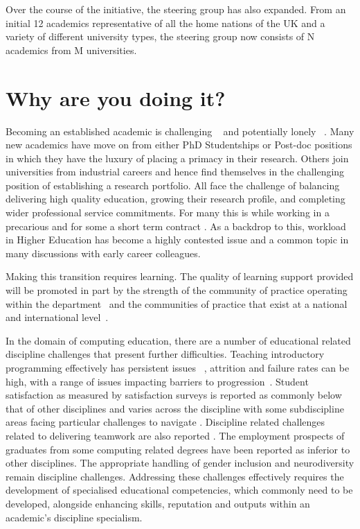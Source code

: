 \documentclass[sigconf]{acmart}
\begin{document}
Over the course of the initiative, the steering group has also expanded. From an initial 12 academics representative of all the home nations of the UK and a variety of different university types, the steering group now consists of N academics from M universities. 

\section{Why are you doing it?}
\label{sec:Why}
Becoming an established academic is challenging ~\cite{Thomas2015} and potentially lonely ~\cite{Foote2009}. Many new academics have move on from either PhD Studentships or Post-doc positions in which they have the luxury of placing a primacy in their research. Others join universities from industrial careers and hence find themselves in the challenging position of establishing a research portfolio. All face the challenge of balancing delivering high quality education, growing their research profile, and completing wider professional service commitments. For many this is while working in a precarious and for some a short term contract \cite{UCU,JaffeS}. As a backdrop to this, workload in Higher Education has become a highly contested issue \cite{UCU2016}and a common topic in many discussions with early career colleagues.

Making this transition requires learning. The quality of learning support provided will be promoted in part by the strength of the community of practice operating within the department~\cite{Bolander2008} and the communities of practice that exist at a national and international level~\cite{Thomas2015}.

In the domain of computing education, there are a number of educational related discipline challenges that present further difficulties. Teaching introductory programming effectively has persistent issues ~\cite{davenport-et-al:latice2016,murphy-et-al:programming2017,simon-et-al:sigcse2018}, attrition and failure rates can be high, with a range of issues impacting barriers to progression~\cite{Watson:2014:FRI:2591708.2591749}. Student satisfaction as measured by satisfaction surveys is reported as commonly below that of other disciplines \cite{Sinclair2015} and varies across the discipline with some subdiscipline areas facing particular challenges to navigate \cite{Knutas2021}. Discipline related challenges related to delivering teamwork are also reported \cite{Gordon2010,Phillips2021}. The employment prospects of graduates from some computing related degrees have been reported as inferior to other disciplines\cite{shadbolt2016shadbolt}. The appropriate handling of gender inclusion \cite{Winter2021} and neurodiversity \cite{Stuurman2109} remain discipline challenges. Addressing these challenges effectively requires the development of specialised educational competencies, which commonly need to be developed, alongside enhancing skills, reputation and outputs within an academic’s discipline specialism. 
\end{document}
